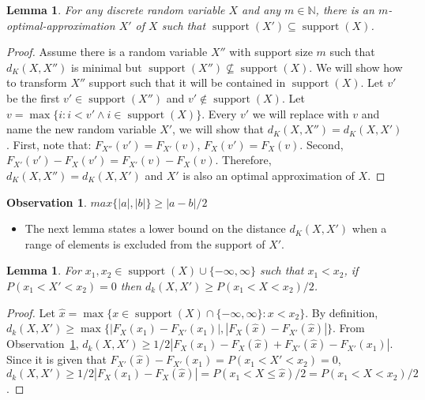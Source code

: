 \documentclass{article}
\newtheorem{lemma}[thm]{Lemma}
\newtheorem{observation}[thm]{Observation}
\DeclareMathOperator{\support}{support}
\begin{document}
\begin{lemma}
	For any discrete random variable $X$ and any $m \in \mathbb{N}$, there is an $m$-optimal-approximation $X'$ of $X$ such that $\support(X') \subseteq \support(X)$.
\end{lemma}
\begin{proof}
Assume there is a random variable $X''$ with support size $m$ such that $d_K(X,X'')$ is minimal but $\support(X'')\nsubseteq\support(X)$.
We will show how to transform $X''$ support such that it will be contained in $\support(X)$. Let $v'$ be the first $v'\in\support(X'')$ and $v' \not\in\support(X)$. Let $v=\max\{i: i<v' \wedge i\in\support(X)\}$. Every $v'$ we will replace with $v$ and name the new random variable $X'$, we will show that $d_K(X,X'') = d_K(X,X')$. First, note that:
$F_{X''}(v')=F_{X'}(v)$, $F_{X}(v')=F_{X}(v)$.
Second,  $F_{X'}(v')-F_{X}(v') = F_{X'}(v)-F_{X}(v)$. Therefore, $d_K(X,X'') = d_K(X,X')$ and $X'$ is also an optimal approximation of $X$.
\end{proof}

\begin{observation}\label{obs:ab}
	$max\{|a|,|b|\} \geq |a-b|/2$
\end{observation}

\begin{itemize}
	\item The next lemma states a lower bound on the distance $d_K(X,X')$ when a range of elements is excluded from the support of $X'$.
\end{itemize}


\begin{lemma}\label{lem:geq}
	For $x_1, x_2 \in \support(X) \cup \{-\infty,\infty\}$ such that $x_1 < x_2$, if $P(x_1 < X' < x_2)=0$  then 
	$d_k(X,X') \geq P(x_1 < X < x_2)/2$.
\end{lemma}
\begin{proof}
	Let $\hat x=\max \{x \in \support(X) \cap\{ -\infty, \infty\}  \colon x < x_2 \}$. By definition, $d_k(X,X') \geq \max \{|F_X(x_1) - F_{X'}(x_1)|, |F_X(\hat x) - F_{X'}(\hat x)| \}$. From Observation~\ref{obs:ab}, $d_k(X,X') \geq 1/2|F_X(x_1) - F_X(\hat x) + F_{X'}(\hat x) - F_{X'}(x_1)|$. Since it is given that $F_{X'}(\hat x) - F_{X'}(x_1) = P(x_1 < X' < x_2)=0$, $d_k(X,X') \geq 1/2|F_X(x_1) - F_X(\hat x) | =  P(x_1 < X \leq \hat x)/2 = P(x_1 < X < x_2)/2$.
\end{proof}
\end{document}
